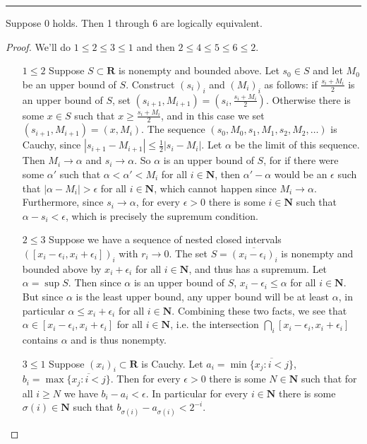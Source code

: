 \documentclass[oneside, 12pt]{memoir}
\theoremstyle{elegant}
\theoremstyle{elegant}
\def\RR{\mathbf R}
\def\NN{\mathbf N}
\begin{document}
\hrule
\begin{thm}
Suppose 0 holds. Then 1 through 6 are logically equivalent.
\end{thm}
\begin{proof} We'll do $1\le 2\le 3\le 1$ and then
$2\le 4\le 5\le 6\le 2$.
\begin{itemize}
\item[$1\le 2$] Suppose $S\subset\RR$ is nonempty and bounded above.
Let $s_0\in S$ and let $M_0$ be an upper bound of $S$.
Construct $(s_i)_i$ and $(M_i)_i$ as follows: if $\frac{s_i + M_i}{2}$
is an upper bound of $S$, set $(s_{i+1}, M_{i+1}) = (s_i, \frac{s_i + M_i}{2})$. Otherwise there is some $x\in S$ such that $x\ge\frac{s_i + M_i}{2}$, and in this case we set $(s_{i+1}, M_{i+1}) = (x, M_i)$.
The sequence $(s_0, M_0, s_1, M_1, s_2, M_2,\dots)$ is Cauchy, since
$|s_{i+1} - M_{i+1}|\le\frac{1}{2}|s_i - M_i|$. Let $\alpha$ be the limit
of this sequence. Then $M_i\to\alpha$ and $s_i\to\alpha$.
So $\alpha$ is an upper bound of $S$, for if there were some $\alpha'$ such that $\alpha < \alpha' < M_i$
for all $i\in\NN$, then $\alpha' - \alpha$ would be an $\epsilon$ such that
$|\alpha - M_i|> \epsilon$ for all $i\in\NN$, which cannot happen since $M_i\to\alpha$.
Furthermore, since $s_i\to\alpha$, for every $\epsilon > 0$ there is
some $i\in\NN$ such that 
$\alpha - s_i < \epsilon$, which is precisely the supremum condition.
\item[$2\le 3$] Suppose we have a sequence of nested closed intervals
$([x_i - \epsilon_i, x_i + \epsilon_i])_i$ with $r_i\to 0$. The set $S = \overline{(x_i - \epsilon_i)_i}$ is nonempty and bounded above by $x_i + \epsilon_i$ for all $i\in\NN$,
and thus has a supremum. Let $\alpha = \sup S$. Then since $\alpha$ is
an upper bound of $S$, $x_i - \epsilon_i\le \alpha$ for all $i\in\NN$.
But since $\alpha$ is the
least upper bound, any upper bound will be at least $\alpha$,
in particular $\alpha\le x_i + \epsilon_i$ for all $i\in\NN$.
Combining these two facts, we see that $\alpha\in[x_i -\epsilon_i, x_i + \epsilon_i]$
for all $i\in\NN$, i.e. the intersection $\bigcap_i[x_i -\epsilon_i, x_i + \epsilon_i]$ contains $\alpha$
and is thus nonempty.
\vfill\pagebreak
\item[$3\le 1$] Suppose $(x_i)_i\subset\RR$ is Cauchy. Let $a_i = \min\overline{\{x_j : i < j\}}$, $b_i = \max\overline{\{x_j : i < j\}}$.
Then for every $\epsilon > 0$ there is some $N\in\NN$ such that for all $i\ge N$ we have 
$b_i - a_i < \epsilon$. In particular for every $i\in\NN$ there is some
$\sigma(i)\in\NN$ such that $b_{\sigma(i)} - a_{\sigma(i)} < 2^{-i}$.

\end{itemize}
\end{proof}
\end{document}
